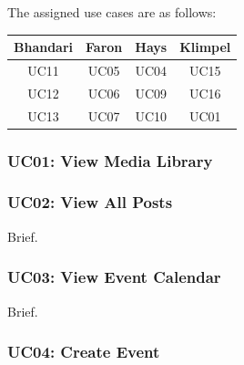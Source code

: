 \documentclass{article}
\begin{document}
The assigned use cases are as follows:

\begin{center}
    \begin{tabular}{ | c | c | c | c | }
        \hline
        Bhandari & Faron & Hays & Klimpel \\
        \hline
        UC11 & UC05 & UC04 & UC15 \\
        \hline
        UC12 & UC06 & UC09 & UC16 \\
        \hline
        UC13 & UC07 & UC10 & UC01 \\
        \hline
    \end{tabular}
\end{center}
\subsubsection{UC01: View Media Library}
\subsubsection{UC02: View All Posts}
Brief.
\subsubsection{UC03: View Event Calendar}
Brief.
\subsubsection{UC04: Create Event}
\end{document}
